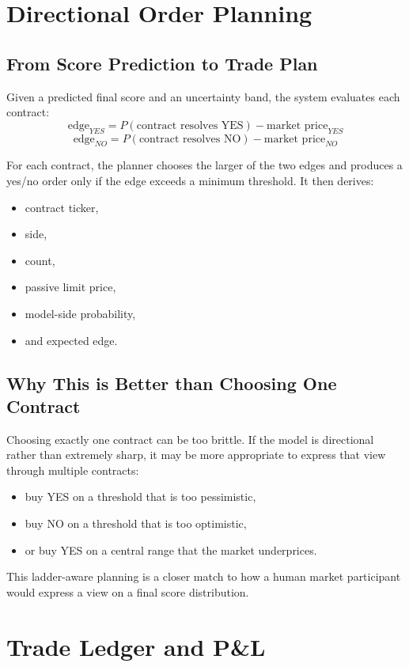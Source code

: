 \documentclass[11pt]{article}
\begin{document}
\section{Directional Order Planning}
\subsection{From Score Prediction to Trade Plan}
Given a predicted final score and an uncertainty band, the system evaluates each contract:
\[
\text{edge}_{YES} = P(\text{contract resolves YES}) - \text{market price}_{YES}
\]
\[
\text{edge}_{NO} = P(\text{contract resolves NO}) - \text{market price}_{NO}
\]

For each contract, the planner chooses the larger of the two edges and produces a yes/no order only if the edge exceeds a minimum threshold. It then derives:
\begin{itemize}[leftmargin=1.5em]
    \item contract ticker,
    \item side,
    \item count,
    \item passive limit price,
    \item model-side probability,
    \item and expected edge.
\end{itemize}

\subsection{Why This is Better than Choosing One Contract}
Choosing exactly one contract can be too brittle. If the model is directional rather than extremely sharp, it may be more appropriate to express that view through multiple contracts:
\begin{itemize}[leftmargin=1.5em]
    \item buy YES on a threshold that is too pessimistic,
    \item buy NO on a threshold that is too optimistic,
    \item or buy YES on a central range that the market underprices.
\end{itemize}

This ladder-aware planning is a closer match to how a human market participant would express a view on a final score distribution.

\section{Trade Ledger and P\&L}
\end{document}
